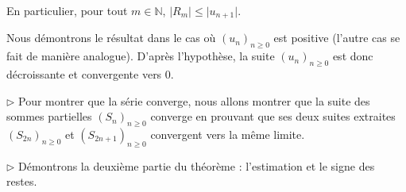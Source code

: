 \documentclass[french,11pt,twoside]{VcCours}
\newcommand{\Sum}[2]{\ensuremath{\textstyle{\sum\limits_{#1}^{#2}}}}
\begin{document}
\begin{Remarque}{} En particulier, pour tout $m \in \mathbb{N}$, $\vert R_m \vert \leq \vert u_{n+1} \vert$.
\end{Remarque}

\begin{Demonstration}{} Nous démontrons le résultat dans le cas où $(u_n)_{n \geq 0}$ est positive (l'autre cas se fait de manière analogue). D'après l'hypothèse, la suite $(u_n)_{n \geq 0}$ est donc décroissante et convergente vers $0$.

\medskip

$\rhd$ Pour montrer que la série converge, nous allons montrer que la suite des sommes partielles $(S_n)_{n \geq 0}$ converge en prouvant que ses deux suites extraites $(S_{2n})_{n \geq 0}$ et $(S_{2n+1})_{n \geq 0}$ convergent vers la même limite. 
%


\vspace{7cm}

\medskip

$\rhd$ Démontrons la deuxième partie du théorème : l'estimation et le signe des restes. 


\newpage

\vspace*{6cm}
\end{Demonstration}
\end{document}
